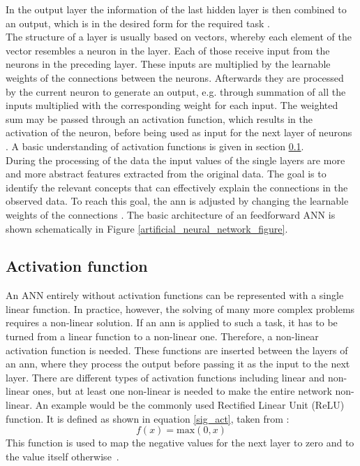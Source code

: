 In the output layer the information of the last hidden layer is then combined to an output, which is in the desired form for the required task \cite[17-20]{aggarwal2018neural}.\\
The structure of a layer is usually based on vectors, whereby each element of the vector resembles a neuron in the layer.
Each of those receive input from the neurons in the preceding layer.
These inputs are multiplied by the learnable weights of the connections between the neurons.
Afterwards they are processed by the current neuron to generate an output, e.g. through summation of all the inputs multiplied with the corresponding weight for each input.
The weighted sum may be passed through an activation function, which results in the activation of the neuron, before being used as input for the next layer of neurons \cite[17-20]{aggarwal2018neural}.
A basic understanding of activation functions is given in section \ref{activation_function}.\\
During the processing of the data the input values of the single layers are more and more abstract features extracted from the original data.
The goal is to identify the relevant concepts that can effectively explain the connections in the observed data.
To reach this goal, the \acs*{ann} is adjusted by changing the learnable weights of the connections \cite[164-167]{Goodfellow-et-al-2016}.
The basic architecture of an feedforward ANN is shown schematically in Figure \ref{artificial_neural_network_figure}.

\subsection{Activation function}\label{activation_function}
An ANN entirely without activation functions can be represented with a single linear function.
In practice, however, the solving of many more complex problems requires a non-linear solution.
If an \acs{ann} is applied to such a task, it has to be turned from a linear function to a non-linear one.
Therefore, a non-linear activation function is needed.
These functions are inserted between the layers of an \acs{ann}, where they process the output before passing it as the input to the next layer.
There are different types of activation functions including linear and non-linear ones, but at least one non-linear is needed to make the entire network non-linear.
An example would be the commonly used Rectified Linear Unit (ReLU) function. It is defined as shown in equation \ref{sig_act}, taken from \cite{Sharma2020}:
\begin{equation}\label{sig_act}
    f(x) = \text{max}(0, x)
\end{equation}
This function is used to map the negative values for the next layer to zero and to the value itself otherwise~\cite{Sharma2020}.

